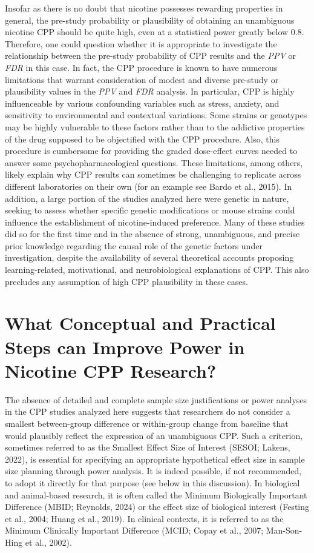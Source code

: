 \documentclass[authordate, meta]{jote-new-article}
\begin{document}
	Insofar as there is no doubt that nicotine possesses rewarding properties in general, the pre-study probability or plausibility of obtaining an unambiguous nicotine CPP should be quite high, even at a statistical power greatly below 0.8. Therefore, one could question whether it is appropriate to investigate the relationship between the pre-study probability of CPP results and the \emph{PPV} or \emph{FDR} in this case. In fact, the CPP procedure is known to have numerous limitations that warrant consideration of modest and diverse pre-study or plausibility values in the \emph{PPV} and \emph{FDR} analysis. In particular, CPP is highly influenceable by various confounding variables such as stress, anxiety, and sensitivity to environmental and contextual variations. Some strains or genotypes may be highly vulnerable to these factors rather than to the addictive properties of the drug supposed to be objectified with the CPP procedure. Also, this procedure is cumbersome for providing the graded dose-effect curves needed to answer some psychopharmacological questions. These limitations, among others, likely explain why CPP results can sometimes be challenging to replicate across different laboratories on their own (for an example see Bardo et al., 2015). In addition, a large portion of the studies analyzed here were genetic in nature, seeking to assess whether specific genetic modifications or mouse strains could influence the establishment of nicotine-induced preference. Many of these studies did so for the first time and in the absence of strong, unambiguous, and precise prior knowledge regarding the causal role of the genetic factors under investigation, despite the availability of several theoretical accounts proposing learning-related, motivational, and neurobiological explanations of CPP. This also precludes any assumption of high CPP plausibility in these cases.



	\section{What Conceptual and Practical Steps can Improve Power in Nicotine CPP Research?}



	The absence of detailed and complete sample size justifications or power analyses in the CPP studies analyzed here suggests that researchers do not consider a smallest between-group difference or within-group change from baseline that would plausibly reflect the expression of an unambiguous CPP. Such a criterion, sometimes referred to as the Smallest Effect Size of Interest (SESOI; Lakens, 2022), is essential for specifying an appropriate hypothetical effect size in sample size planning through power analysis. It is indeed possible, if not recommended, to adopt it directly for that purpose (see below in this discussion). In biological and animal-based research, it is often called the Minimum Biologically Important Difference (MBID; Reynolds, 2024) or the effect size of biological interest (Festing et al., 2004; Huang et al., 2019). In clinical contexts, it is referred to as the Minimum Clinically Important Difference (MCID; Copay et al., 2007; Man-Son-Hing et al., 2002).
\end{document}
